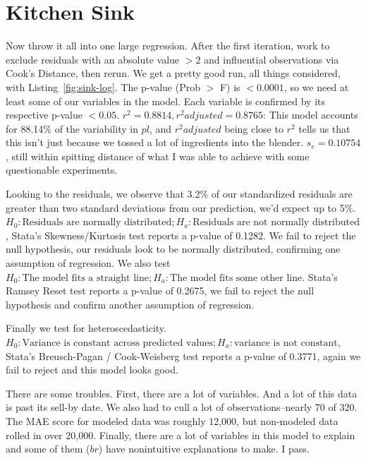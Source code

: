 \documentclass[twocolumn,11pt]{article}
\begin{document}

\section*{Kitchen Sink}
Now throw it all into one large regression.
After the first iteration,
work to exclude residuals with an absolute value $>2$ and influential observations via Cook's Distance,
then rerun.
We get a pretty good run, all things considered, with Listing~\ref{fig:sink-log}.
The p-value (Prob $>$ F) is $<0.0001$, so we need at least some of our variables in the model.
Each variable is confirmed by its respective p-value $<0.05$.
$r^2 = 0.8814, r^2 adjusted = 0.8765$: This model accounts for 88.14\% of the variability in $pl$,
and $r^2 adjusted$ being close to $r^2$ tells us that this isn't just because we tossed a lot of
ingredients into the blender.
$s_e = 0.10754$, still within spitting distance of what I was
able to achieve with some questionable experiments.

Looking to the residuals, we observe that 3.2\% of our standardized residuals are greater than two standard deviations
from our prediction, we'd expect up to 5\%.
$H_0: \text{Residuals are normally distributed}; H_a: \text{Residuals are not normally distributed}$,
Stata's Skewness/Kurtosis test reports a p-value of 0.1282.
We fail to reject the null hypothesis, our residuals look to be normally distributed,
confirming one assumption of regression. We also test $H_0: \text{The model fits a straight line}; H_a: \text{The model fits some other line}$.
Stata's Ramsey Reset test reports a p-value of 0.2675, we fail to reject the null hypothesis
and confirm another assumption of regression.

Finally we test for heteroscedasticity.
$H_0: \text{Variance is constant across predicted values}; H_a: \text{variance is not constant}$,
Stata's Breusch-Pagan / Cook-Weisberg test reports a p-value of 0.3771,
again we fail to reject and this model looks good.

There are some troubles.
First, there are a lot of variables. And a lot of this data is past its sell-by date.
We also had to cull a lot of observations--nearly 70 of 320.
The MAE score for modeled data was roughly 12,000, but non-modeled data rolled in over 20,000.
Finally, there are a lot of variables in this model to explain and some of them ($br$)
have nonintuitive explanations to make.
I pass.
\end{document}
